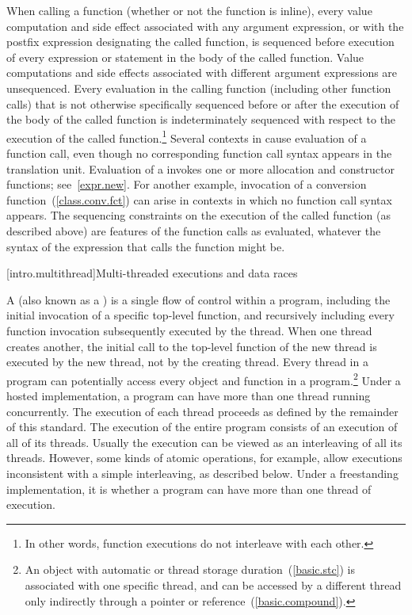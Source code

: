 When calling a function (whether or not the function is inline), every
%
value computation and
%
side effect associated with any argument
expression, or with the postfix expression designating the called
function, is sequenced before execution of every expression or statement
in the body of the called function. \enternote
Value computations and
side effects associated with different argument expressions are
unsequenced. \exitnote Every evaluation in the calling function
(including other function calls) that is not otherwise specifically
sequenced before or after the execution of the body of the called
function is indeterminately sequenced with respect to the execution of
the called function.\footnote{In other words, function executions do not interleave with
each other.}
Several contexts in \Cpp  cause evaluation of a function call, even
though no corresponding function call syntax appears in the translation
unit.
\enterexample
Evaluation of a  invokes one or more allocation
and constructor functions; see~\ref{expr.new}. For another example,
invocation of a conversion function~(\ref{class.conv.fct}) can arise in
contexts in which no function call syntax appears.
\exitexample
The sequencing constraints on the execution of the called function (as
described above) are features of the function calls as evaluated,
whatever the syntax of the expression that calls the function might be.%
%

[intro.multithread]{Multi-threaded executions and data races}

\pnum
{}%
%
A  (also known as a ) is a single flow of
control within a program, including the initial invocation of a specific
top-level function, and recursively including every function invocation
subsequently executed by the thread. \enternote When one thread creates another,
the initial call to the top-level function of the new thread is executed by the
new thread, not by the creating thread. \exitnote Every thread in a program can
potentially access every object and function in a program.\footnote{An object
with automatic or thread storage duration~(\ref{basic.stc}) is associated with
one specific thread, and can be accessed by a different thread only indirectly
through a pointer or reference~(\ref{basic.compound}).} Under a hosted
implementation, a \Cpp program can have more than one thread running
concurrently. The execution of each thread proceeds as defined by the remainder
of this standard. The execution of the entire program consists of an execution
of all of its threads. \enternote Usually the execution can be viewed as an
interleaving of all its threads. However, some kinds of atomic operations, for
example, allow executions inconsistent with a simple interleaving, as described
below. \exitnote Under a freestanding implementation, it is  whether a program can
have more than one thread of execution.

